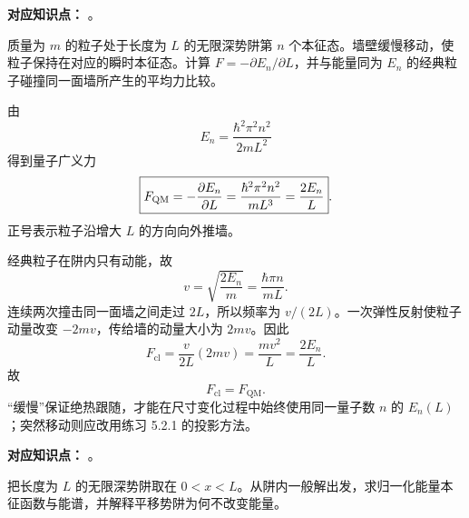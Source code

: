 
\textbf{对应知识点：}
。

质量为 $m$ 的粒子处于长度为 $L$ 的无限深势阱第 $n$ 个本征态。墙壁缓慢移动，使粒子保持在对应的瞬时本征态。计算 $F=-\partial E_n/\partial L$，并与能量同为 $E_n$ 的经典粒子碰撞同一面墙所产生的平均力比较。

\begin{checkedsolution}
由
\begin{equation}
  E_n=\frac{\hbar^2\pi^2n^2}{2mL^2}
  \label{eq:QM-C05-S02-E04-energy}
\end{equation}
得到量子广义力
\begin{equation}
  \boxed{
  F_{\mathrm{QM}}
  =-\frac{\partial E_n}{\partial L}
  =\frac{\hbar^2\pi^2n^2}{mL^3}
  =\frac{2E_n}{L}}.
  \label{eq:QM-C05-S02-E04-quantum-force}
\end{equation}
正号表示粒子沿增大 $L$ 的方向向外推墙。

经典粒子在阱内只有动能，故
\begin{equation}
  v=\sqrt{\frac{2E_n}{m}}
  =\frac{\hbar\pi n}{mL}.
  \label{eq:QM-C05-S02-E04-speed}
\end{equation}
连续两次撞击同一面墙之间走过 $2L$，所以频率为 $v/(2L)$。一次弹性反射使粒子动量改变 $-2mv$，传给墙的动量大小为 $2mv$。因此
\begin{equation}
  F_{\mathrm{cl}}
  =\frac{v}{2L}(2mv)
  =\frac{mv^2}{L}
  =\frac{2E_n}{L}.
  \label{eq:QM-C05-S02-E04-classical-force}
\end{equation}
故
\begin{equation}
  \boxed{F_{\mathrm{cl}}=F_{\mathrm{QM}}}.
  \label{eq:QM-C05-S02-E04-force-agreement}
\end{equation}
“缓慢”保证绝热跟随，才能在尺寸变化过程中始终使用同一量子数 $n$ 的 $E_n(L)$；突然移动则应改用练习 5.2.1 的投影方法。
\end{checkedsolution}


\textbf{对应知识点：}
。

把长度为 $L$ 的无限深势阱取在 $0<x<L$。从阱内一般解出发，求归一化能量本征函数与能谱，并解释平移势阱为何不改变能量。

